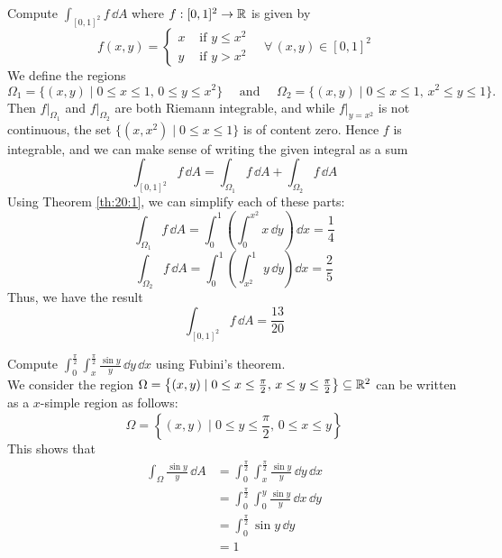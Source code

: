 \documentclass[../Analysis-3.tex]{subfiles}
\begin{document}
\begin{Eg}{}{}
  Compute $\displaystyle\int_{[0,1]^2} f \, \dd A$ where $f : [0,1]^2 \to \mathbb{R}$ is given by
  \[
    f(x,y) = \begin{cases}
      x & \mbox{ if } y \leq x^2 \\ y & \mbox{ if } y > x^2
    \end{cases} \quad \forall \, (x,y) \in [0,1]^2
  \]
  We define the regions
  \[
    \Omega_1 = \{ (x,y) \mid 0 \leq x \leq 1, \, 0 \leq y \leq x^2 \} \quad \mbox{ and } \quad \Omega_2 = \{ (x,y) \mid 0 \leq x \leq 1, \, x^2 \leq y \leq 1 \}.
  \]
  Then $f\vert_{\Omega_1}$ and $f\vert_{\Omega_2}$ are both Riemann integrable, and while $f\vert_{y=x^2}$ is not continuous, the set $\{ (x,x^2) \mid 0 \leq x \leq 1 \}$ is of content zero. Hence $f$ is integrable, and we can make sense of writing the given integral as a sum
  \[
    \int_{[0,1]^2} f \, \dd A = \int_{\Omega_1} f \, \dd A + \int_{\Omega_2} f \, \dd A
  \]
  Using Theorem \ref{th:20:1}, we can simplify each of these parts:
  \[
    \int_{\Omega_1} f \, \dd A = \int_0^1 \left( \int_0^{x^2} x \, \dd y \right)\, \dd x = \frac{1}{4}
  \]
  \[
    \int_{\Omega_2} f \, \dd A = \int_0^1 \left( \int_{x^2}^1 y \, \dd y\right)\dd x = \frac{2}{5}
  \]
  Thus, we have the result
  \[
    \int_{[0,1]^2} f \, \dd A = \frac{13}{20}
  \]
\end{Eg}

\begin{Eg}{}{}
  Compute $\displaystyle{ \int_0^{\frac{\pi}{2}} \int_x^{\frac{\pi}{2}}} \frac{\sin y}{y} \, \dd y \, \dd x$ using Fubini's theorem.\\[.1 cm]
  We consider the region $\Omega = \left\{ (x,y) \mid 0 \leq x \leq \frac{\pi}{2}, \, x \leq y \leq \frac{\pi}{2} \right\} \subseteq \mathbb{R}^2$ can be written as a $x$-simple region as follows:
  \[
    \Omega = \left\{ (x,y) \mid 0 \leq y \leq \frac{\pi}{2}, \, 0 \leq x \leq y \right\}
  \]
  This shows that
  \begin{align*}
    \int_{\Omega} \frac{\sin y}{y} \, \dd A
     & = \int_{0}^{\frac{\pi}{2}} \int_x^{\frac{\pi}{2}} \frac{\sin y}{y} \, \dd y \, \dd x \\
     & = \int_0^{\frac{\pi}{2}} \int_0^y \frac{\sin y}{y} \, \dd x \, \dd y                 \\
     & = \int_0^{\frac{\pi}{2}} \sin y \, \dd y                                             \\
     & = 1
  \end{align*}
\end{Eg}
\end{document}
